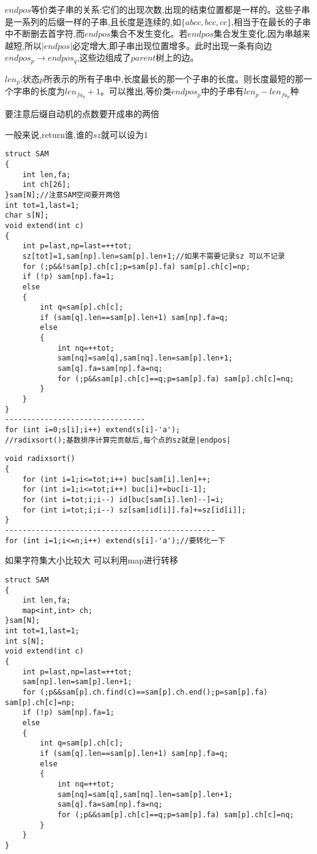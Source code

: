 \documentclass[a4paper]{ctexart}
\begin{document}
$endpos$等价类子串的关系:它们的出现次数,出现的结束位置都是一样的。这些子串是一系列的后缀一样的子串,且长度是连续的,如$\{abcc,bcc,cc\}$,相当于在最长的子串中不断删去首字符,而$endpos$集合不发生变化。若$endpos$集合发生变化,因为串越来越短,所以$|endpos|$必定增大,即子串出现位置增多。此时出现一条有向边$endpos_p\rightarrow endpos_q$,这些边组成了$parent$树上的边。

$len_p$:状态$p$所表示的所有子串中,长度最长的那一个子串的长度。则长度最短的那一个字串的长度为$len_{fa_p}+1$。可以推出,等价类$endpos_p$中的子串有$len_p-len_{fa_p}$种

要注意后缀自动机的点数要开成串的两倍

一般来说,return谁,谁的$sz$就可以设为$1$

\begin{lstlisting}
struct SAM
{
    int len,fa;
    int ch[26];
}sam[N];//注意SAM空间要开两倍
int tot=1,last=1;
char s[N];
void extend(int c)
{
    int p=last,np=last=++tot;
    sz[tot]=1,sam[np].len=sam[p].len+1;//如果不需要记录sz 可以不记录 
    for (;p&&!sam[p].ch[c];p=sam[p].fa) sam[p].ch[c]=np;
    if (!p) sam[np].fa=1;
    else
    {
        int q=sam[p].ch[c];
        if (sam[q].len==sam[p].len+1) sam[np].fa=q;
        else
        {
            int nq=++tot;
            sam[nq]=sam[q],sam[nq].len=sam[p].len+1;
            sam[q].fa=sam[np].fa=nq;
            for (;p&&sam[p].ch[c]==q;p=sam[p].fa) sam[p].ch[c]=nq;
        }
    }
}
--------------------------------
for (int i=0;s[i];i++) extend(s[i]-'a');
//radixsort();基数排序计算完贡献后,每个点的sz就是|endpos|
\end{lstlisting}

\begin{lstlisting}
void radixsort()
{
    for (int i=1;i<=tot;i++) buc[sam[i].len]++;
    for (int i=1;i<=tot;i++) buc[i]+=buc[i-1];
    for (int i=tot;i;i--) id[buc[sam[i].len]--]=i;
    for (int i=tot;i;i--) sz[sam[id[i]].fa]+=sz[id[i]];
}
------------------------------------------------
for (int i=1;i<=n;i++) extend(s[i]-'a');//要转化一下
\end{lstlisting}

如果字符集大小比较大 可以利用map进行转移

\begin{lstlisting}
struct SAM
{
    int len,fa;
    map<int,int> ch;
}sam[N];
int tot=1,last=1;
int s[N];
void extend(int c)
{
    int p=last,np=last=++tot;
    sam[np].len=sam[p].len+1;
    for (;p&&sam[p].ch.find(c)==sam[p].ch.end();p=sam[p].fa) sam[p].ch[c]=np;
    if (!p) sam[np].fa=1;
    else
    {
        int q=sam[p].ch[c];
        if (sam[q].len==sam[p].len+1) sam[np].fa=q;
        else
        {
            int nq=++tot;
            sam[nq]=sam[q],sam[nq].len=sam[p].len+1;
            sam[q].fa=sam[np].fa=nq;
            for (;p&&sam[p].ch[c]==q;p=sam[p].fa) sam[p].ch[c]=nq;
        }
    }
}
\end{lstlisting}
\end{document}
